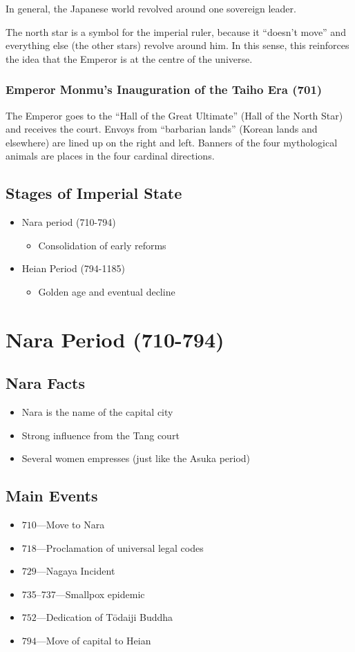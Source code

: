\documentclass[class=article, crop=false]{standalone}
\begin{document}
  In general, the Japanese world revolved around one sovereign leader.
  \begin{note}{}
    The north star is a symbol for the imperial ruler, because it ``doesn't move'' and everything else (the other stars) revolve around him. In this sense, this reinforces the idea that the Emperor is at the centre of the universe.
  \end{note}
  \subsubsection{Emperor Monmu's Inauguration of the Taiho Era (701)}
  The Emperor goes to the ``Hall of the Great Ultimate'' (Hall of the North Star) and receives the court. Envoys from ``barbarian lands'' (Korean lands and elsewhere) are lined up on the right and left. Banners of the four mythological animals are places in the four cardinal directions.
  \subsection{Stages of Imperial State}
  \begin{itemize}
    \item Nara period (710-794)
    \begin{itemize}
      \item Consolidation of early reforms
    \end{itemize}
    \item Heian Period (794-1185)
    \begin{itemize}
      \item Golden age and eventual decline
    \end{itemize}
  \end{itemize}
  \section{Nara Period (710-794)}
  \subsection{Nara Facts}
  \begin{itemize}
    \item Nara is the name of the capital city
    \item Strong influence from the Tang court
    \item Several women empresses (just like the Asuka period)
  \end{itemize}
  \subsection{Main Events}
  \begin{itemize}
    \item $710$---Move to Nara
    \item $718$---Proclamation of universal legal codes
    \item $729$---Nagaya Incident
    \item 735--737---Smallpox epidemic
    \item $752$---Dedication of T\=odaiji Buddha
    \item $794$---Move of capital to Heian
  \end{itemize}
\end{document}
